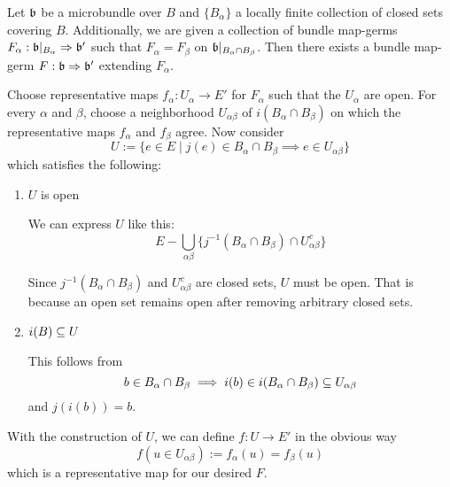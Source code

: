 \begin{mylemma}
    Let $\mathfrak{b}$ be a microbundle over $B$ and $\{B_\alpha\}$ a locally finite collection of closed sets covering $B$.
    Additionally, we are given a collection of bundle map-germs $F_\alpha: \mathfrak{b}\vert_{B_\alpha} \Rightarrow \mathfrak{b}'$
    such that $F_\alpha = F_\beta$ on $\mathfrak{b}\vert_{B_\alpha \cap B_\beta}$.
    Then there exists a bundle map-germ $F: \mathfrak{b} \Rightarrow \mathfrak{b}'$ extending $F_\alpha$.
\end{mylemma}
\begin{myproof}
    Choose representative maps $f_\alpha: U_\alpha \to E'$ for $F_\alpha$ such that the $U_\alpha$ are open.
    For every $\alpha$ and $\beta$, choose a neighborhood $U_{\alpha\beta}$ of $i(B_\alpha \cap B_\beta)$ on which the representative maps $f_\alpha$ and $f_\beta$ agree.
    Now consider
    \[ U := \{ e \in E \mid j(e) \in B_\alpha \cap B_\beta \implies e \in U_{\alpha\beta} \}\]
    which satisfies the following:
    \begin{enumerate}
        \item $U$ is open

        We can express $U$ like this:
        \[ E - \bigcup_{\alpha\beta} \{ j^{-1}(B_\alpha \cap B_\beta) \cap U_{\alpha\beta}^c \} \]
        
        Since $j^{-1}(B_\alpha \cap B_\beta)$ and $U_{\alpha\beta}^c$ are closed sets, $U$ must be open.
        That is because an open set remains open after removing arbitrary closed sets.
        \item $i(B) \subseteq{} U$
        
        This follows from
        \[ b \in B_\alpha \cap B_\beta \implies i(b) \in i(B_\alpha \cap B_\beta) \subseteq{} U_{\alpha\beta} \]
        and $j(i(b)) = b$.
    \end{enumerate}
    With the construction of $U$, we can define $f: U \to E'$ in the obvious way
    \[ f(u \in U_{\alpha\beta}) := f_\alpha(u) = f_\beta(u) \]
    which is a representative map for our desired $F$.
\end{myproof}